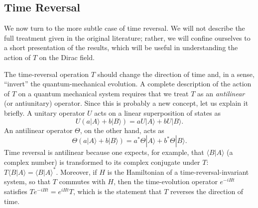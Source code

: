 \subsection{Time Reversal}

We now turn to the more subtle case of time reversal.  We will not describe
the full treatment given in the original literature; rather, we will confine
ourselves to a short presentation of the results, which will be useful in
understanding the action of $T$ on the Dirac field.

The time-reversal operation $T$ should change the direction of time and, in
a sense, ``invert'' the quantum-mechanical evolution.  A complete description
of the action of $T$ on a quantum mechanical system requires that we treat
$T$ as an \emph{antilinear} (or antiunitary) operator.  Since this is
probably a new concept, let us explain it briefly.  A unitary operator $U$
acts on a linear superposition of states as
\begin{equation}
  U(a|A\rangle + b|B\rangle) = aU|A\rangle + bU|B\rangle .
\end{equation}
An antilinear operator $\Theta$, on the other hand, acts as
\begin{equation}
  \Theta(a|A\rangle + b|B\rangle) = a^{*}\Theta|A\rangle + b^{*}\Theta|B\rangle .
\end{equation}
Time reversal is antilinear because one expects, for example, that
$\langle B|A\rangle$ (a complex number) is transformed to its complex
conjugate under $T$: $T\langle B|A\rangle = \langle B|A\rangle^{*}$.
Moreover, if $H$ is the Hamiltonian of a time-reversal-invariant system, so
that $T$ commutes with $H$, then the time-evolution operator $e^{-iHt}$
satisfies $Te^{-iHt} = e^{iHt}T$, which is the statement that $T$ reverses
the direction of time.


